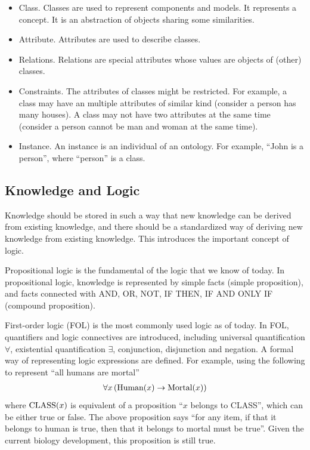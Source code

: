 \begin{itemize}
  \item Class. Classes are used to represent components and models. It represents a concept. It is an abstraction of objects sharing some similarities.
  \item Attribute. Attributes are used to describe classes.
  \item Relations. Relations are special attributes whose values are objects of (other) classes.
  \item Constraints. The attributes of classes might be restricted. For example, a class may have an multiple attributes of similar kind (consider a person has many houses). A class may not have two attributes at the same time (consider a person cannot be man and woman at the same time).
  \item Instance. An instance is an individual of an ontology. For example, “John is a person”, where “person” is a class.
\end{itemize}

\subsection{Knowledge and Logic}

Knowledge should be stored in such a way that new knowledge can be derived from existing knowledge, and there should be a standardized way of deriving new knowledge from existing knowledge. This introduces the important concept of logic.

Propositional logic is the fundamental of the logic that we know of today. In propositional logic, knowledge is represented by simple facts (simple proposition), and facts connected with  AND, OR, NOT, IF THEN, IF AND ONLY IF (compound proposition).

First-order logic (FOL) is the most commonly used logic as of today. In FOL, quantifiers and logic connectives are introduced, including universal quantification $\forall$, existential quantification $\exists$, conjunction, disjunction and negation. A formal way of representing logic expressions are defined. For example, using the following to represent ``all humans are mortal''
\begin{eqnarray}
\forall x \left(\textup{Human}(x) \rightarrow \textup{Mortal}(x)\right) \nonumber
\end{eqnarray}
where $\textup{CLASS}(x)$ is equivalent of a proposition ``$x$ belongs to CLASS'', which can be either true or false. The above proposition says ``for any item, if that it belongs to human is true, then that it belongs to mortal must be true''. Given the current biology development, this proposition is still true.

